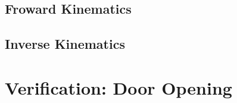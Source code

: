 
	\subsection{Froward Kinematics} 
		
	\subsection{Inverse Kinematics}\label{sec:ik}
			

\section{Verification: Door Opening}\label{sec:hubo-achVerification}
	

